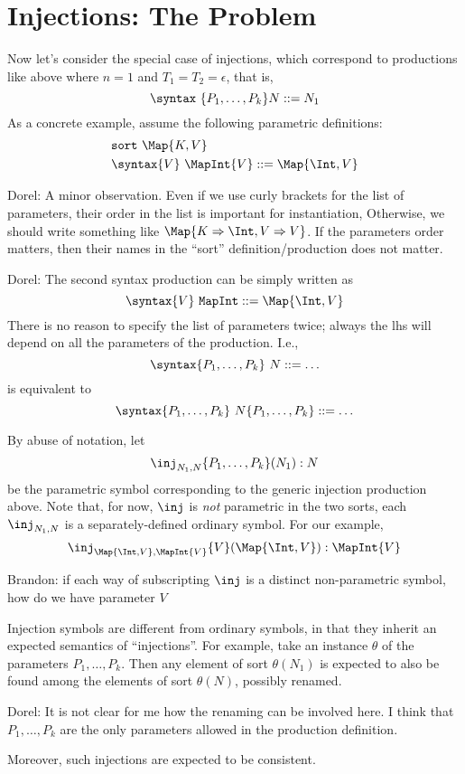 \documentclass{article}
\newcommand\comment[2]{\par\noindent\color{red}#1: #2\color{black}\par\noindent}
\newcommand\dl{\comment{Dorel}}
\theoremstyle{definition}
\theoremstyle{definition}
\theoremstyle{definition}
\theoremstyle{theorem}
\theoremstyle{theorem}
\theoremstyle{theorem}
\newcommand{\sort}{\texttt{sort}}
\begin{document}
\section{Injections: The Problem}
Now let's consider the special case of injections,
which correspond to productions like above where
\(n=1\) and \(T_1=T_2=\epsilon\), that is,
\[\syntax\ \{P_1,\ldots,P_k\} N::=N_1\]
As a concrete example, assume the following parametric definitions:
\begin{align*}
&\sort\ \Map{K,V}\\
&\syntax\{V\}\ \MapInt{V} ::= \Map{\Int,V}
\end{align*}
\dl{A minor observation. Even if we use curly brackets for the list of parameters, their order in the list is important for instantiation, Otherwise, we should write something like \(\Map{K\Rightarrow \Int, V\Rightarrow V}\). If the parameters order matters, then their names in the ``sort'' definition/production does not matter.}
\dl{The second syntax production can be simply written as
\[\syntax\{V\}\ \texttt{MapInt} ::= \Map{\Int, V}\]
There is no reason to specify the list of parameters twice; always the lhs will depend on all the parameters of the production. I.e.,
\[\syntax\{P_1,\ldots,P_k\}\ N ::= \ldots\]
is equivalent to
\[\syntax\{P_1,\ldots,P_k\}\ N\{P_1,\ldots,P_k\} ::= \ldots\]}
By abuse of notation, let
\[\inj_{N_1,N}\{P_1,\ldots,P_k\}(N_1):N\]
be the parametric symbol corresponding to the generic injection
production above.
Note that, for now, \(\inj\) is \emph{not} parametric in the two sorts,
each \(\inj_{N_1,N}\) is a separately-defined ordinary symbol.
For our example,
\[\inj_{\Map{\Int,V},\MapInt{V}}\{V\}(\Map{\Int,V}): \MapInt{V}\]
\comment{Brandon}{if each way of subscripting \(\inj\) is a distinct non-parametric
symbol, how do we have parameter \(V\) }
Injection symbols are different from ordinary symbols, in that they
inherit an expected semantics of ``injections''.
For example, take an instance \(\theta\) of the parameters
\(P_1,\ldots,P_k\).
Then any element of sort \(\theta(N_1)\) is expected to also be found
among the elements of sort \(\theta(N)\), possibly renamed.
\dl{It is not clear for me how the renaming can be involved here. I think that \(P_1,\ldots,P_k\) are the only parameters allowed in the production definition.}
Moreover, such injections are expected to be consistent.
\end{document}
